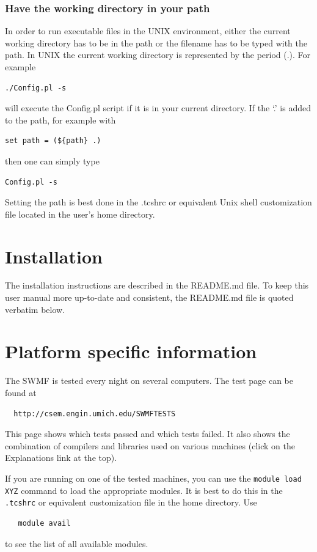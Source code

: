 \subsubsection{Have the working directory in your path}

In order to run executable files in the UNIX environment, either
the current working directory has to be in the path or the filename has
to be typed with the path.
In UNIX the current working directory is represented
by the period (.).  For example
\begin{verbatim} 
./Config.pl -s
\end{verbatim}
will execute the Config.pl script if it is in your current directory.  
If the `.' is added to the path, for example with
\begin{verbatim}
set path = (${path} .)
\end{verbatim}
then one can simply type
\begin{verbatim} 
Config.pl -s
\end{verbatim}
Setting the path is best done in the .tcshrc or equivalent Unix shell 
customization file located in the user's home directory.

\section{Installation}

The installation instructions are described in the README.md file.
To keep this user manual more up-to-date and consistent, 
the README.md file is quoted verbatim below.


\section{Platform specific information}

The SWMF is tested every night on several computers.
The test page can be found at
\begin{verbatim}
  http://csem.engin.umich.edu/SWMFTESTS
\end{verbatim}
This page shows which tests passed and which tests failed.
It also shows the combination of compilers and libraries
used on various machines (click on the Explanations link at the top).

If you are running on one of the tested machines, 
you can use the {\tt module load XYZ} command to load 
the appropriate modules. It is best to do this in the {\tt .tcshrc}
or equivalent customization file in the home directory. Use
\begin{verbatim}
   module avail
\end{verbatim}
to see the list of all available modules.

